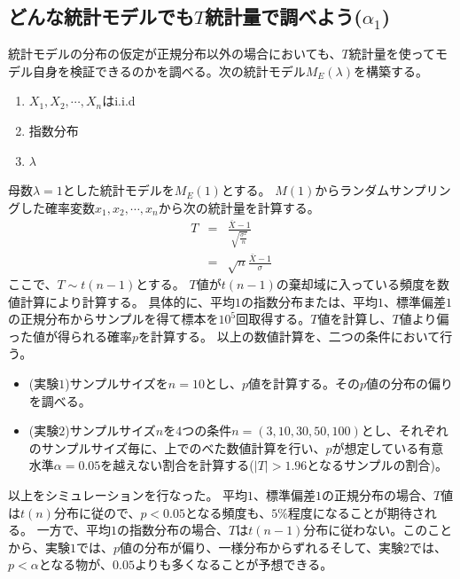 \subsection{どんな統計モデルでも$T$統計量で調べよう($\alpha_1$)}
統計モデルの分布の仮定が正規分布以外の場合においても、$T$統計量を使ってモデル自身を検証できるのかを調べる。次の統計モデル$M_E(\lambda)$を構築する。
\begin{enumerate}
    \item $X_1,X_2,\cdots,X_n $はi.i.d
    \item 指数分布
    \item $\lambda$
\end{enumerate}
母数$\lambda=1$とした統計モデルを$M_E(1)$とする。
$M(1)$からランダムサンプリングした確率変数$x_1,x_2,\cdots,x_n$から次の統計量を計算する。
\begin{eqnarray*}
    T &=& \frac{\bar{X}-1}{\sqrt{\frac{\sigma^2}{n}}} \\
 &=& \sqrt{n}\frac{\bar{X}-1}{\sigma}%
\end{eqnarray*}
ここで、$T \sim t(n-1)$とする。
$T$値が$t(n-1)$の棄却域に入っている頻度を数値計算により計算する。
具体的に、平均$1$の指数分布または、平均$1$、標準偏差$1$の正規分布からサンプルを得て標本を$10^5$回取得する。$T$値を計算し、$T$値より偏った値が得られる確率$p$を計算する。
以上の数値計算を、二つの条件において行う。
\begin{itemize}
 \item (実験$1$)サンプルサイズを$n=10$とし、$p$値を計算する。その$p$値の分布の偏りを調べる。
 \item (実験$2$)サンプルサイズ$n$を4つの条件$n=(3,10,30,50,100)$とし、それぞれのサンプルサイズ毎に、上でのべた数値計算を行い、$p$が想定している有意水準$\alpha=0.05$を越えない割合を計算する($|T|>1.96$となるサンプルの割合)。
\end{itemize}
以上をシミュレーションを行なった。
平均$1$、標準偏差$1$の正規分布の場合、$T$値は$t(n)$分布に従ので、$p<0.05$となる頻度も、$5\%$程度になることが期待される。
一方で、平均$1$の指数分布の場合、$T$は$t(n-1)$分布に従わない。このことから、実験$1$では、$p$値の分布が偏り、一様分布からずれるそして、実験$2$では、$p<\alpha$となる物が、$0.05$よりも多くなることが予想できる。


